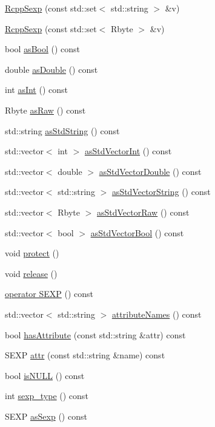 \begin{DoxyCompactItemize}
\item 
\hyperlink{classRcppSexp_a991a6f440c8a294f2dc88530440fc3e3}{RcppSexp} (const std::set$<$ std::string $>$ \&v)
\item 
\hyperlink{classRcppSexp_a429ba2c201e1535e1884d819b25479be}{RcppSexp} (const std::set$<$ Rbyte $>$ \&v)
\item 
bool \hyperlink{classRcppSexp_ad4ee2b8e4024eded1a8468f627fdd9ca}{asBool} () const 
\item 
double \hyperlink{classRcppSexp_a418a55a88fe2161d2bce11dbe1d49153}{asDouble} () const 
\item 
int \hyperlink{classRcppSexp_abf1d0f9b957e14e1ed3846eac93c7ccd}{asInt} () const 
\item 
Rbyte \hyperlink{classRcppSexp_ad699e452afde5da0170a00b9536c3166}{asRaw} () const 
\item 
std::string \hyperlink{classRcppSexp_ade685360b8c743411135def23f229911}{asStdString} () const 
\item 
std::vector$<$ int $>$ \hyperlink{classRcppSexp_a52e3a6412053e02416a62d15525b69ae}{asStdVectorInt} () const 
\item 
std::vector$<$ double $>$ \hyperlink{classRcppSexp_ab68e3dc2062d2b336405836ffb0f22c4}{asStdVectorDouble} () const 
\item 
std::vector$<$ std::string $>$ \hyperlink{classRcppSexp_a7ae15462b92d708a80711bc597d72255}{asStdVectorString} () const 
\item 
std::vector$<$ Rbyte $>$ \hyperlink{classRcppSexp_a36d997dd386ef298196752f61cd51358}{asStdVectorRaw} () const 
\item 
std::vector$<$ bool $>$ \hyperlink{classRcppSexp_aacbec90ef55c66fe5e56bdb1c84d76db}{asStdVectorBool} () const 
\item 
void \hyperlink{classRcppSexp_af8089b6667c4d6d5a8d0db5410e3caf9}{protect} ()
\item 
void \hyperlink{classRcppSexp_a4ac544b2eb8ab56023f79edbf65415ce}{release} ()
\item 
\hyperlink{classRcppSexp_a5e51f763919d30c1e7cb96da93c677af}{operator SEXP} () const 
\item 
std::vector$<$ std::string $>$ \hyperlink{classRcppSexp_a2e2c70bec0b9f99c523c364ebccaa4f3}{attributeNames} () const 
\item 
bool \hyperlink{classRcppSexp_a26b3bf25f73cc6fb9c4fc7681ed62a6e}{hasAttribute} (const std::string \&attr) const 
\item 
SEXP \hyperlink{classRcppSexp_a307406502d249d2fd8ad41d155c87302}{attr} (const std::string \&name) const 
\item 
bool \hyperlink{classRcppSexp_a9c9535a92dacf3efe0c2267a54360ee7}{isNULL} () const 
\item 
int \hyperlink{classRcppSexp_aee3e1880f92d8e4a69d79617813c48c6}{sexp\_\-type} () const 
\item 
SEXP \hyperlink{classRcppSexp_ad55b673427e49062e2f3ec493160d1e3}{asSexp} () const 
\end{DoxyCompactItemize}
